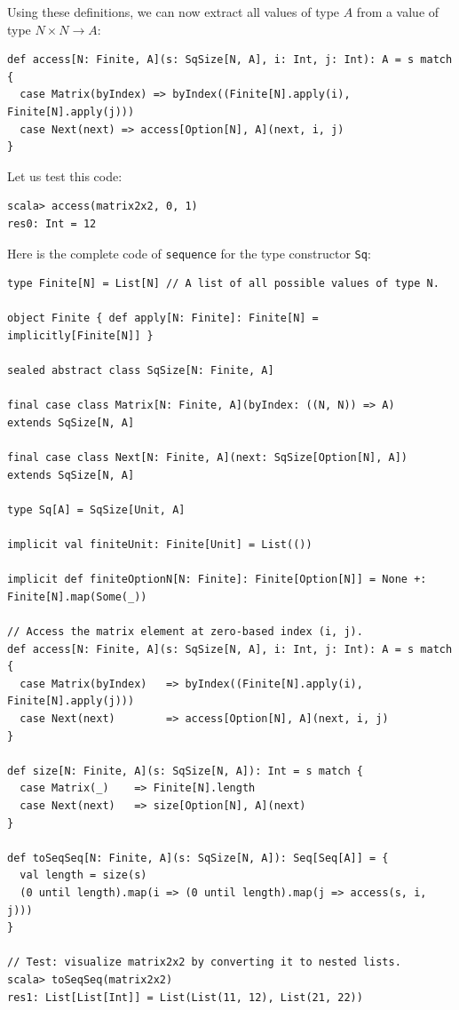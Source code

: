 Using these definitions, we can now extract all values of type $A$
from a value of type $N\times N\rightarrow A$:
\begin{lstlisting}
def access[N: Finite, A](s: SqSize[N, A], i: Int, j: Int): A = s match {
  case Matrix(byIndex) => byIndex((Finite[N].apply(i), Finite[N].apply(j)))
  case Next(next) => access[Option[N], A](next, i, j)
}
\end{lstlisting}
Let us test this code:
\begin{lstlisting}
scala> access(matrix2x2, 0, 1)
res0: Int = 12
\end{lstlisting}

Here is the complete code of \lstinline!sequence! for the type constructor
\lstinline!Sq!:

\begin{lstlisting}[frame=single,fillcolor={\color{black}},framesep={0.2mm},framexleftmargin=2mm,framexrightmargin=2mm,framextopmargin=2mm,framexbottommargin=2mm]
type Finite[N] = List[N] // A list of all possible values of type N.

object Finite { def apply[N: Finite]: Finite[N] = implicitly[Finite[N]] }

sealed abstract class SqSize[N: Finite, A]

final case class Matrix[N: Finite, A](byIndex: ((N, N)) => A)   extends SqSize[N, A]

final case class Next[N: Finite, A](next: SqSize[Option[N], A]) extends SqSize[N, A]

type Sq[A] = SqSize[Unit, A]

implicit val finiteUnit: Finite[Unit] = List(())

implicit def finiteOptionN[N: Finite]: Finite[Option[N]] = None +: Finite[N].map(Some(_))

// Access the matrix element at zero-based index (i, j).
def access[N: Finite, A](s: SqSize[N, A], i: Int, j: Int): A = s match {
  case Matrix(byIndex)   => byIndex((Finite[N].apply(i), Finite[N].apply(j)))
  case Next(next)        => access[Option[N], A](next, i, j)
}

def size[N: Finite, A](s: SqSize[N, A]): Int = s match {      
  case Matrix(_)    => Finite[N].length
  case Next(next)   => size[Option[N], A](next)
}

def toSeqSeq[N: Finite, A](s: SqSize[N, A]): Seq[Seq[A]] = {
  val length = size(s)
  (0 until length).map(i => (0 until length).map(j => access(s, i, j)))
} 

// Test: visualize matrix2x2 by converting it to nested lists.
scala> toSeqSeq(matrix2x2)
res1: List[List[Int]] = List(List(11, 12), List(21, 22))


\end{lstlisting}
